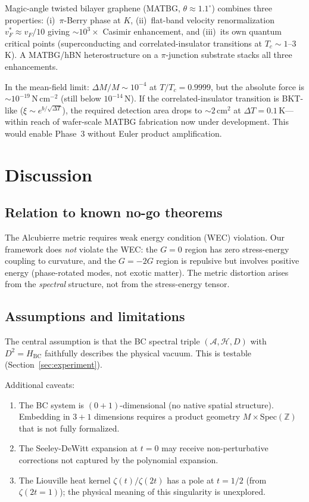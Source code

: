 \documentclass[aps,prd,twocolumn,superscriptaddress,nofootinbib]{revtex4-2}
\newcommand{\Spec}{\mathrm{Spec}}
\begin{document}
Magic-angle twisted bilayer graphene (MATBG, $\theta \approx 1.1^\circ$)
combines three properties: (i)~$\pi$-Berry phase at $K$,
(ii)~flat-band velocity renormalization $v_F^* \approx v_F/10$
giving $\sim 10^3\times$ Casimir enhancement, and
(iii)~its own quantum critical points (superconducting and
correlated-insulator transitions at $T_c \sim 1$--3\,K).
A MATBG/hBN heterostructure on a $\pi$-junction substrate
stacks all three enhancements.

In the mean-field limit:
$\Delta M/M \sim 10^{-4}$ at $T/T_c = 0.9999$,
but the absolute force is $\sim 10^{-19}$\,N\,cm$^{-2}$
(still below $10^{-14}$\,N).
If the correlated-insulator transition is BKT-like
($\xi \sim e^{b/\sqrt{\Delta T}}$),
the required detection area drops to $\sim 2$\,cm$^2$
at $\Delta T = 0.1$\,K---within reach of
wafer-scale MATBG fabrication now under development.
This would enable Phase~3 without Euler product amplification.

\section{Discussion}

\subsection{Relation to known no-go theorems}

The Alcubierre metric requires weak energy condition (WEC) violation.
Our framework does \emph{not} violate the WEC:
the $G = 0$ region has zero stress-energy coupling to curvature,
and the $G = -2G$ region is repulsive but involves positive energy
(phase-rotated modes, not exotic matter).
The metric distortion arises from the \emph{spectral} structure,
not from the stress-energy tensor.

\subsection{Assumptions and limitations}

The central assumption is that the BC spectral triple
$(\mathcal{A}, \mathcal{H}, D)$ with $D^2 = H_{\mathrm{BC}}$
faithfully describes the physical vacuum.
This is testable (Section~\ref{sec:experiment}).

Additional caveats:
\begin{enumerate}
\item The BC system is $(0+1)$-dimensional (no native spatial structure).
  Embedding in $3+1$ dimensions requires a product geometry
  $M \times \Spec(\mathbb{Z})$ that is not fully formalized.
\item The Seeley-DeWitt expansion at $t = 0$ may receive
  non-perturbative corrections not captured by the polynomial expansion.
\item The Liouville heat kernel $\zeta(t)/\zeta(2t)$ has a pole at
  $t = 1/2$ (from $\zeta(2t = 1)$); the physical meaning of this
  singularity is unexplored.
\end{enumerate}
\end{document}
